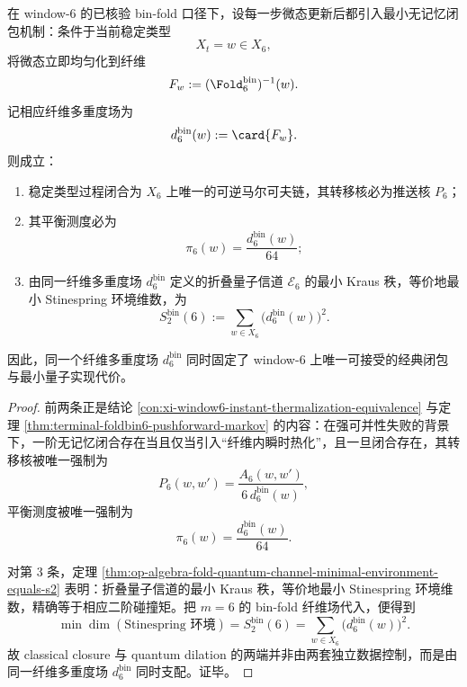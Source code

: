 \begin{theorem}\label{thm:conclusion-window6-classical-closure-quantum-dilation-same-fiber-law}
在 window-\(6\) 的已核验 bin-fold 口径下，设每一步微态更新后都引入最小无记忆闭包机制：条件于当前稳定类型
\[
X_t=w\in X_6,
\]
将微态立即均匀化到纤维
\[
F_w:=(\Fold_6^{\mathrm{bin}})^{-1}(w).
\]
记相应纤维多重度场为
\[
d_6^{\mathrm{bin}}(w):=\card{F_w}.
\]
则成立：
\begin{enumerate}
  \item 稳定类型过程闭合为 \(X_6\) 上唯一的可逆马尔可夫链，其转移核必为推送核 \(P_6\)；
  \item 其平衡测度必为
  \[
  \pi_6(w)=\frac{d_6^{\mathrm{bin}}(w)}{64};
  \]
  \item 由同一纤维多重度场 \(d_6^{\mathrm{bin}}\) 定义的折叠量子信道 \(\mathcal E_6\) 的最小 Kraus 秩，等价地最小 Stinespring 环境维数，为
  \[
  S^{\mathrm{bin}}_2(6):=\sum_{w\in X_6}\bigl(d_6^{\mathrm{bin}}(w)\bigr)^2.
  \]
\end{enumerate}
因此，同一个纤维多重度场 \(d_6^{\mathrm{bin}}\) 同时固定了 window-\(6\) 上唯一可接受的经典闭包与最小量子实现代价。
\end{theorem}
\begin{proof}
前两条正是结论 \ref{con:xi-window6-instant-thermalization-equivalence} 与定理 \ref{thm:terminal-foldbin6-pushforward-markov} 的内容：在强可并性失败的背景下，一阶无记忆闭合存在当且仅当引入“纤维内瞬时热化”，且一旦闭合存在，其转移核被唯一强制为
\[
P_6(w,w')=\frac{A_6(w,w')}{6\,d_6^{\mathrm{bin}}(w)},
\]
平衡测度被唯一强制为
\[
\pi_6(w)=\frac{d_6^{\mathrm{bin}}(w)}{64}.
\]

对第 \(3\) 条，定理 \ref{thm:op-algebra-fold-quantum-channel-minimal-environment-equals-s2} 表明：折叠量子信道的最小 Kraus 秩，等价地最小 Stinespring 环境维数，精确等于相应二阶碰撞矩。把 \(m=6\) 的 bin-fold 纤维场代入，便得到
\[
\min\dim(\text{Stinespring 环境})
=
S^{\mathrm{bin}}_2(6)
=
\sum_{w\in X_6}\bigl(d_6^{\mathrm{bin}}(w)\bigr)^2.
\]
故 classical closure 与 quantum dilation 的两端并非由两套独立数据控制，而是由同一纤维多重度场 \(d_6^{\mathrm{bin}}\) 同时支配。证毕。
\end{proof}

